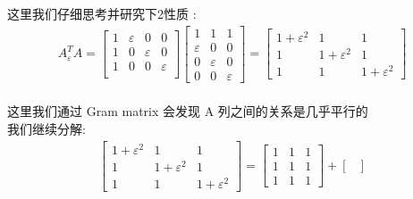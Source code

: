 \documentclass[12pt]{article}
\begin{document}
\begin{flushleft}
    这里我们仔细思考并研究下2性质 : \\
    \begin{align}
        A_{\varepsilon}^{T}A =
        \begin{bmatrix}
            1 & \varepsilon & 0           & 0           \\
            1 & 0           & \varepsilon & 0           \\
            1 & 0           & 0           & \varepsilon \\
        \end{bmatrix}\begin{bmatrix}
                         1           & 1           & 1           \\
                         \varepsilon & 0           & 0           \\
                         0           & \varepsilon & 0           \\
                         0           & 0           & \varepsilon
                     \end{bmatrix}
        = \begin{bmatrix}
              1 + \varepsilon^{2} & 1                   & 1                   \\
              1                   & 1 + \varepsilon^{2} & 1                   \\
              1                   & 1                   & 1 + \varepsilon^{2}
          \end{bmatrix}
    \end{align} \\
    这里我们通过 Gram matrix 会发现 A 列之间的关系是几乎平行的 \\
    我们继续分解: \\
    \begin{align}
        \begin{bmatrix}
            1 + \varepsilon^{2} & 1                   & 1                   \\
            1                   & 1 + \varepsilon^{2} & 1                   \\
            1                   & 1                   & 1 + \varepsilon^{2}
        \end{bmatrix} = \begin{bmatrix}
                            1 & 1 & 1 \\
                            1 & 1 & 1 \\
                            1 & 1 & 1
                        \end{bmatrix} + \begin{bmatrix}

\end{bmatrix}
\end{align}
\end{flushleft}
\end{document}
